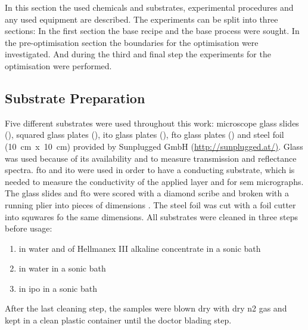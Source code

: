 In this section the used chemicals and substrates, experimental procedures and any used 
equipment are described. 
The experiments can be split into three sections: 
In the first section the base recipe and the base process were sought. 
In the pre-optimisation section the boundaries for the optimisation were investigated. 
And during the third and final step the experiments for the optimisation were performed.
\subsection{Substrate Preparation}
Five different substrates were used throughout this work: 
microscope glass slides (\x{}), squared glass plates (\x{}), \gls{ito} glass plates (\x{}), \gls{fto} glass plates (\x{}) and steel foil (10~cm~x~10~cm) provided by Sunplugged GmbH (\url{http://sunplugged.at/)}.
%
Glass was used because of its availability and to measure transmission and reflectance 
spectra. \gls{fto} and \gls{ito} were used in order to have a conducting substrate, which
is needed to measure the conductivity of the applied layer and for \gls{sem} micrographs.
The glass slides and \gls{fto} were scored with a diamond scribe and broken with a running plier into pieces of dimensions \x{}.
The steel foil was cut with a foil cutter into squwares fo the same dimensions. 
All substrates were cleaned in three steps before usage:
\begin{enumerate}
	\item {} in  \gls{water} and  of Hellmanex III alkaline concentrate in a sonic bath
	\item {} in \gls{water} in a sonic bath
	\item {} in \gls{ipo} in a sonic bath 
\end{enumerate}
After the last cleaning step, the samples were blown dry with dry \gls{n2} gas and kept in a clean plastic container until the doctor blading step.

